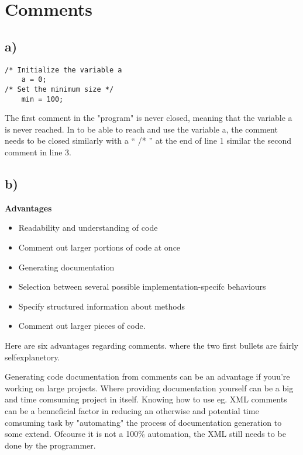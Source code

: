\section{Comments}

\subsection{a)}

\begin{verbatim}
/* Initialize the variable a
    a = 0;
/* Set the minimum size */
    min = 100;
\end{verbatim}

The first comment in the "program" is never closed, meaning
that the variable a is never reached. In to be able to reach and use the variable
a, the comment needs to be closed similarly with a `` /* '' at the end of line 1
similar the second comment in line 3.

\subsection{b)}

\textbf{Advantages}
\begin{itemize}
    \item Readability and understanding of code
    \item Comment out larger portions of code at once
    \item Generating documentation
    \item Selection between several possible implementation-specifc behaviours
    \item Specify structured information about methods
    \item Comment out larger pieces of code.
\end{itemize}

Here are six advantages regarding comments. where the two first bullets are fairly selfexplanetory.

Generating code documentation from comments can be an advantage if youu're working on large projects.
Where providing documentation yourself can be a big and time comsuming project in itself. Knowing how
to use eg. XML comments can be a benneficial factor in reducing an otherwise and potential
time comsuming task by "automating" the process of documentation generation to some extend. Ofcourse
it is not a 100\% automation, the XML still needs to be done by the programmer. 

